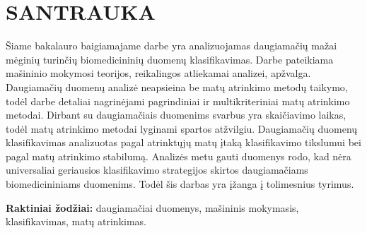 \section*{SANTRAUKA}
\label{santrauka}

Šiame bakalauro baigiamajame darbe yra analizuojamas daugiamačių mažai mėginių turinčių biomedicininių duomenų klasifikavimas. Darbe pateikiama mašininio mokymosi teorijos, reikalingos atliekamai analizei, apžvalga. Daugiamačių duomenų analizė neapsieina be matų atrinkimo metodų taikymo, todėl darbe detaliai nagrinėjami pagrindiniai ir multikriteriniai matų atrinkimo metodai. Dirbant su daugiamačiais duomenims svarbus yra skaičiavimo laikas, todėl matų atrinkimo metodai lyginami spartos atžvilgiu. Daugiamačių duomenų klasifikavimas analizuotas pagal atrinktųjų matų įtaką klasifikavimo tikslumui bei pagal matų atrinkimo stabilumą. Analizės metu gauti duomenys rodo, kad nėra universaliai geriausios klasifikavimo strategijos skirtos daugiamačiams biomedicininiams duomenims. Todėl šis darbas yra įžanga į tolimesnius tyrimus.

\textbf{Raktiniai žodžiai:} daugiamačiai duomenys, mašininis mokymasis, klasifikavimas, matų atrinkimas. 